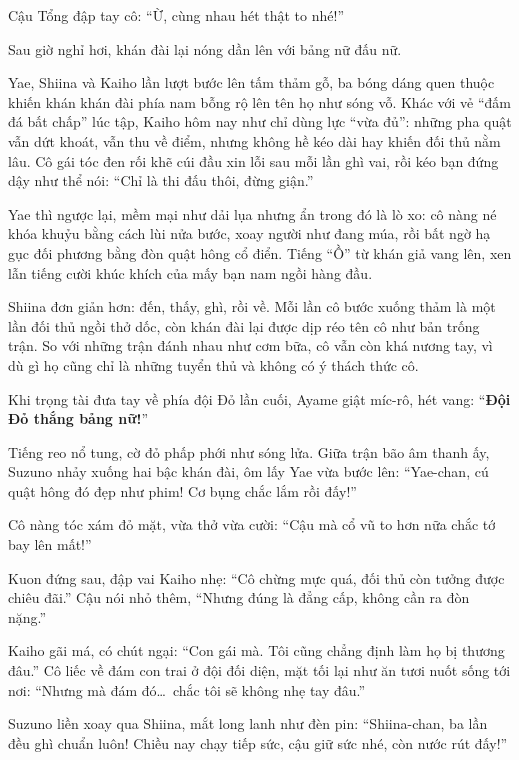 \documentclass[../main.tex]{subfiles}
\begin{document}
Cậu Tổng đập tay cô: ``Ừ, cùng nhau hét thật to nhé!''

\ct

Sau giờ nghỉ hơi, khán đài lại nóng dần lên với bảng nữ đấu nữ.

Yae, Shiina và Kaiho lần lượt bước lên tấm thảm gỗ, ba bóng dáng quen thuộc khiến khán khán đài phía nam bỗng rộ lên tên họ như sóng vỗ. Khác với vẻ ``đấm đá bất chấp'' lúc tập, Kaiho hôm nay như chỉ dùng lực ``vừa đủ'': những pha quật vẫn dứt khoát, vẫn thu về điểm, nhưng không hề kéo dài hay khiến đối thủ nằm lâu.  Cô gái tóc đen rối khẽ cúi đầu xin lỗi sau mỗi lần ghì vai, rồi kéo bạn đứng dậy như thể nói: ``Chỉ là thi đấu thôi, đừng giận.''

Yae thì ngược lại, mềm mại như dải lụa nhưng ẩn trong đó là lò xo: cô nàng né khóa khuỷu bằng cách lùi nửa bước, xoay người như đang múa, rồi bất ngờ hạ gục đối phương bằng đòn quật hông cổ điển.  Tiếng ``Ồ'' từ khán giả vang lên, xen lẫn tiếng cười khúc khích của mấy bạn nam ngồi hàng đầu.

Shiina đơn giản hơn: đến, thấy, ghì, rồi về.  Mỗi lần cô bước xuống thảm là một lần đối thủ ngồi thở dốc, còn khán đài lại được dịp réo tên cô như bản trống trận. So với những trận đánh nhau như cơm bữa, cô vẫn còn khá nương tay, vì dù gì họ cũng chỉ là những tuyển thủ và không có ý thách thức cô.

Khi trọng tài đưa tay về phía đội Đỏ lần cuối, Ayame giật míc-rô, hét vang: ``\textbf{Đội Đỏ thắng bảng nữ!}''

Tiếng reo nổ tung, cờ đỏ phấp phới như sóng lửa.  Giữa trận bão âm thanh ấy, Suzuno nhảy xuống hai bậc khán đài, ôm lấy Yae vừa bước lên: ``Yae-chan, cú quật hông đó đẹp như phim!  Cơ bụng chắc lắm rồi đấy!''

Cô nàng tóc xám đỏ mặt, vừa thở vừa cười: ``Cậu mà cổ vũ to hơn nữa chắc tớ bay lên mất!''

Kuon đứng sau, đập vai Kaiho nhẹ: ``Cô chừng mực quá, đối thủ còn tưởng được chiêu đãi.''  Cậu nói nhỏ thêm, ``Nhưng đúng là đẳng cấp, không cần ra đòn nặng.''

Kaiho gãi má, có chút ngại: ``Con gái mà. Tôi cũng chẳng định làm họ bị thương đâu.'' Cô liếc về đám con trai ở đội đối diện, mặt tối lại như ăn tươi nuốt sống tới nơi: ``Nhưng mà đám đó\dots\ chắc tôi sẽ không nhẹ tay đâu.''

Suzuno liền xoay qua Shiina, mắt long lanh như đèn pin: ``Shiina-chan, ba lần đều ghì chuẩn luôn!  Chiều nay chạy tiếp sức, cậu giữ sức nhé, còn nước rút đấy!''
\end{document}
